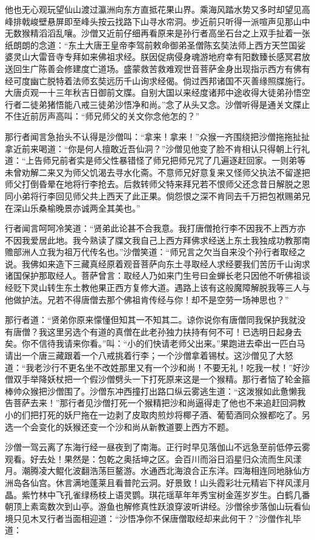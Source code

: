 \documentclass[12pt,UTF8]{ctexbook}
\begin{document}
他也无心观玩望仙山渡过瀛洲向东方直抵花果山界。乘海风踏水势又多时却望见高峰排戟峻壁悬屏即至峰头按云找路下山寻水帘洞。步近前只听得一派喧声见那山中无数猴精滔滔乱嚷。沙僧又近前仔细再看原来是孙行者高坐石台之上双手扯着一张纸朗朗的念道：“东土大唐王皇帝李驾前敕命御弟圣僧陈玄奘法师上西方天竺国娑婆灵山大雷音寺专拜如来佛祖求经。朕因促病侵身魂游地府幸有阳数臻长感冥君放送回生广陈善会修建度亡道场。盛蒙救苦救难观世音菩萨金身出现指示西方有佛有经可度幽亡脱特着法师玄奘远历千山询求经偈。倘过西邦诸国不灭善缘照牒施行。大唐贞观一十三年秋吉日御前文牒。自别大国以来经度诸邦中途收得大徒弟孙悟空行者二徒弟猪悟能八戒三徒弟沙悟净和尚。”念了从头又念。沙僧听得是通关文牒止不住近前厉声高叫：“师兄师父的关文你念他怎的？”

那行者闻言急抬头不认得是沙僧叫：“拿来！拿来！”众猴一齐围绕把沙僧拖拖扯扯拿近前来喝道：“你是何人擅敢近吾仙洞？”沙僧见他变了脸不肯相认只得朝上行礼道：“上告师兄前者实是师父性暴错怪了师兄把师兄咒了几遍逐赶回家。一则弟等未曾劝解二来又为师父饥渴去寻水化斋。不意师兄好意复来又怪师父执法不留遂把师父打倒昏晕在地将行李抢去。后救转师父特来拜兄若不恨师父还念昔日解脱之恩同小弟将行李回见师父共上西天了此正果。倘怨恨之深不肯同去千万把包袱赐弟兄在深山乐桑榆晚景亦诚两全其美也。”

行者闻言呵呵冷笑道：“贤弟此论甚不合我意。我打唐僧抢行李不因我不上西方亦不因我爱居此地。我今熟读了牒文我自己上西方拜佛求经送上东土我独成功教那南赡部洲人立我为祖万代传名也。”沙僧笑道：“师兄言之欠当自来没个孙行者取经之说。我佛如来造下三藏真经原着观音菩萨向东土寻取经人求经要我们苦历千山询求诸国保护那取经人。菩萨曾言：取经人乃如来门生号曰金蝉长老只因他不听佛祖谈经贬下灵山转生东土教他果正西方复修大道。遇路上该有这般魔障解脱我等三人与他做护法。兄若不得唐僧去那个佛祖肯传经与你！却不是空劳一场神思也？”

那行者道：“贤弟你原来懞懂但知其一不知其二。谅你说你有唐僧同我保护我就没有唐僧？我这里另选个有道的真僧在此老孙独力扶持有何不可！已选明日起身去矣。你不信待我请来你看。”叫：“小的们快请老师父出来。”果跑进去牵出一匹白马请出一个唐三藏跟着一个八戒挑着行李；一个沙僧拿着锡杖。这沙僧见了大怒道：“我老沙行不更名坐不改姓那里又有一个沙和尚！不要无礼！吃我一杖！”好沙僧双手举降妖杖把一个假沙僧劈头一下打死原来这是一个猴精。那行者恼了轮金箍棒帅众猴把沙僧围了。沙僧东冲西撞打出路口纵云雾逃生道：“这泼猴如此惫懒我告菩萨去来！”那行者见沙僧打死一个猴精把沙和尚逼得走了他也不来追赶回洞教小的们把打死的妖尸拖在一边剥了皮取肉煎炒将椰子酒、葡萄酒同众猴都吃了。另选一个会变化的妖猴还变一个沙和尚从新教道要上西方不题。

沙僧一驾云离了东海行经一昼夜到了南海。正行时早见落伽山不远急至前低停云雾观看。好去处！果然是：包乾之奥括坤之区。会百川而浴日滔星归众流而生风漾月。潮腾凌大鲲化波翻浩荡巨鳌游。水通西北海浪合正东洋。四海相连同地脉仙方洲岛各仙宫。休言满地蓬莱且看普陀云洞。好景致！山头霞彩壮元精岩下祥风漾月晶。紫竹林中飞孔雀绿杨枝上语灵鹦。琪花瑶草年年秀宝树金莲岁岁生。白鹤几番朝顶上素鸾数次到山亭。游鱼也解修真性跃浪穿波听讲经。沙僧徐步落伽山玩看仙境只见木叉行者当面相迎道：“沙悟净你不保唐僧取经却来此何干？”沙僧作礼毕道：
\end{document}
